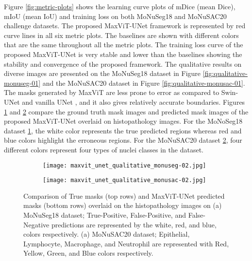 \documentclass{article}
\begin{document}
Figure \ref{fig:metric-plots} shows the learning curve plots of mDice (mean Dice), mIoU (mean IoU) and training loss on both MoNuSeg18 and MoNuSAC20 challenge datasets. The proposed MaxViT-UNet framework is represented by red curve lines in all six metric plots. The baselines are shown with different colors that are the same throughout all the metric plots. The training loss curve of the proposed MaxViT-UNet is very stable and lower than the baselines showing the stability and convergence of the proposed framework. The qualitative results on diverse images are presented on the MoNuSeg18 dataset in Figure \ref{fig:qualitative-monuseg-01} and the MoNuSAC20 dataset in Figure \ref{fig:qualitative-monusac-01}. The masks generated by MaxViT are less prone to error as compared to Swin-UNet \cite{cao2022swin} and vanilla UNet \cite{ronneberger2015u}, and it also gives relatively accurate boundaries. Figures \ref{fig:qualitative-monuseg-02} and \ref{fig:qualitative-monusac-02} compare the ground truth mask images and predicted mask images of the proposed MaxViT-UNet overlaid on histopathology images. For the MoNoSeg18 dataset \ref{fig:qualitative-monuseg-02}, the white color represents the true predicted regions whereas red and blue colors highlight the erroneous regions. For the MoNuSAC20 dataset \ref{fig:qualitative-monusac-02}, four different colors represent four types of nuclei classes in the dataset.

\begin{figure}[ht!]
  \centering
  \begin{subfigure}[]{0.48\textwidth}
    \centering
    \texttt{[image: maxvit\_unet\_qualitative\_monuseg-02.jpg]}
    \caption{}
    \label{fig:qualitative-monuseg-02}
  \end{subfigure}
  \hfill
  \begin{subfigure}[]{0.48\textwidth}
    \centering
    \texttt{[image: maxvit\_unet\_qualitative\_monusac-02.jpg]}
    \caption{}
    \label{fig:qualitative-monusac-02}
  \end{subfigure}
  \caption{Comparison of True masks (top rows) and MaxViT-UNet predicted masks (bottom rows) overlaid on the histopathology images on (a) MoNuSeg18 dataset; True-Positive, False-Positive, and False-Negative predictions are represented by the white, red, and blue, colors respectively. (a) MoNuSAC20 dataset; Epithelial, Lymphocyte, Macrophage, and Neutrophil are represented with Red, Yellow, Green, and Blue colors respectively.}
  \label{fig:qualitative-overlay}
\end{figure}
\end{document}
